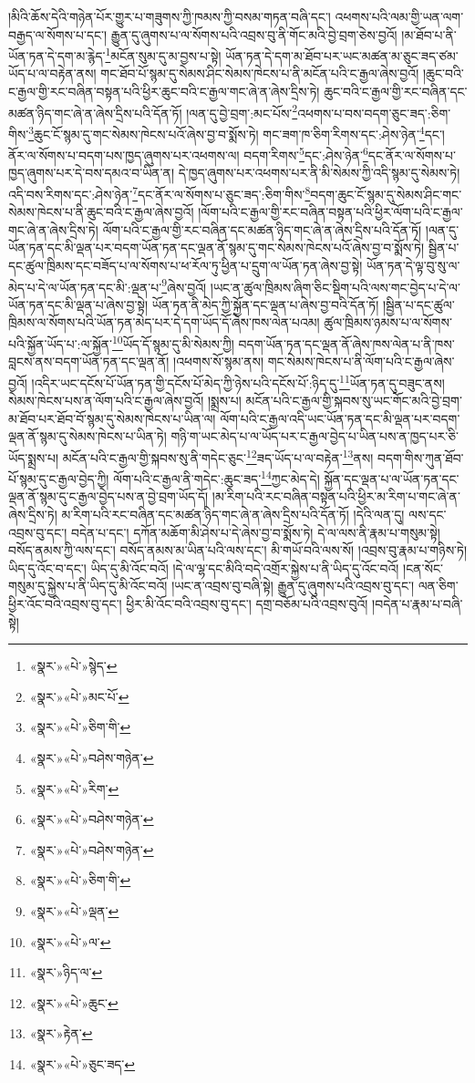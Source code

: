 །མིའི་ཆོས་དེའི་གཉེན་པོར་གྱུར་པ་གཟུགས་ཀྱི་ཁམས་ཀྱི་བསམ་གཏན་བཞི་དང་། འཕགས་པའི་ལམ་གྱི་ཡན་ལག་བརྒྱད་ལ་སོགས་པ་དང་། རྒྱུན་དུ་ཞུགས་པ་ལ་སོགས་པའི་འབྲས་བུ་ནི་གོང་མའི་བྱེ་བྲག་ཅེས་བྱའོ། །མ་ཐོབ་པ་ནི་ཡོན་ཏན་དེ་དག་མ་རྙེད་\footnote{«སྣར་»«པེ་»སྙེད་}མངོན་སུམ་དུ་མ་བྱས་པ་སྟེ། ཡོན་ཏན་དེ་དག་མ་ཐོབ་པར་ཡང་མཚན་མ་ཅུང་ཟད་ཙམ་ཡོད་པ་ལ་བརྟེན་ནས། གང་ཐོབ་པོ་སྙམ་དུ་སེམས་ཤིང་སེམས་ཁེངས་པ་ནི་མངོན་པའི་ང་རྒྱལ་ཞེས་བྱའོ། །ཆུང་བའི་ང་རྒྱལ་གྱི་རང་བཞིན་བསྟན་པའི་ཕྱིར་ཆུང་བའི་ང་རྒྱལ་གང་ཞེ་ན་ཞེས་དྲིས་ཏེ། ཆུང་བའི་ང་རྒྱལ་གྱི་རང་བཞིན་དང་མཚན་ཉིད་གང་ཞེ་ན་ཞེས་དྲིས་པའི་དོན་ཏོ། །ལན་དུ་བྱེ་བྲག་:མང་པོས་\footnote{«སྣར་»«པེ་»མང་པོ་}འཕགས་པ་བས་བདག་ཅུང་ཟད་:ཅིག་གིས་\footnote{«སྣར་»«པེ་»ཅིག་གི་}ཆུང་ངོ་སྙམ་དུ་གང་སེམས་ཁེངས་པའོ་ཞེས་བྱ་བ་སྨོས་ཏེ། གང་ཟག་ཁ་ཅིག་རིགས་དང་:ཤེས་ཉེན་\footnote{«སྣར་»«པེ་»བཤེས་གཉེན་}དང་། ནོར་ལ་སོགས་པ་བདག་པས་ཁྱད་ཞུགས་པར་འཕགས་ལ། བདག་རིགས་\footnote{«སྣར་»«པེ་»རིག་}དང་:ཤེས་ཉེན་\footnote{«སྣར་»«པེ་»བཤེས་གཉེན་}དང་ནོར་ལ་སོགས་པ་ཁྱད་ཞུགས་པར་དེ་བས་དམའ་བ་ཡིན་ན། དེ་ཁྱད་ཞུགས་པར་འཕགས་པར་ནི་མི་སེམས་ཀྱི་འདི་སྙམ་དུ་སེམས་ཏེ། འདི་བས་རིགས་དང་:ཤེས་ཉེན་\footnote{«སྣར་»«པེ་»བཤེས་གཉེན་}དང་ནོར་ལ་སོགས་པ་ཅུང་ཟད་:ཅིག་གིས་\footnote{«སྣར་»«པེ་»ཅིག་གི་}བདག་ཆུང་ངོ་སྙམ་དུ་སེམས་ཤིང་གང་སེམས་ཁེངས་པ་ནི་ཆུང་བའི་ང་རྒྱལ་ཞེས་བྱའོ། །ལོག་པའི་ང་རྒྱལ་གྱི་རང་བཞིན་བསྟན་པའི་ཕྱིར་ལོག་པའི་ང་རྒྱལ་གང་ཞེ་ན་ཞེས་དྲིས་ཏེ། ལོག་པའི་ང་རྒྱལ་གྱི་རང་བཞིན་དང་མཚན་ཉིད་གང་ཞེ་ན་ཞེས་དྲིས་པའི་དོན་ཏོ། །ལན་དུ་ཡོན་ཏན་དང་མི་ལྡན་པར་བདག་ཡོན་ཏན་དང་ལྡན་ནོ་སྙམ་དུ་གང་སེམས་ཁེངས་པའོ་ཞེས་བྱ་བ་སྨོས་ཏེ། སྦྱིན་པ་དང་ཚུལ་ཁྲིམས་དང་བཟོད་པ་ལ་སོགས་པ་ཕ་རོལ་ཏུ་ཕྱིན་པ་དྲུག་ལ་ཡོན་ཏན་ཞེས་བྱ་སྟེ། ཡོན་ཏན་དེ་ལྟ་བུ་སུ་ལ་མེད་པ་དེ་ལ་ཡོན་ཏན་དང་མི་:ལྡན་པ་\footnote{«སྣར་»«པེ་»ལྡན་}ཞེས་བྱའོ། །ཡང་ན་ཚུལ་ཁྲིམས་ཞིག་ཅིང་སྡིག་པའི་ལས་གང་བྱེད་པ་དེ་ལ་ཡོན་ཏན་དང་མི་ལྡན་པ་ཞེས་བྱ་སྟེ། ཡོན་ཏན་ནི་མེད་ཀྱི་སྐྱོན་དང་ལྡན་པ་ཞེས་བྱ་བའི་དོན་ཏོ། །སྦྱིན་པ་དང་ཚུལ་ཁྲིམས་ལ་སོགས་པའི་ཡོན་ཏན་མེད་པར་དེ་དག་ཡོད་དོ་ཞེས་ཁས་ལེན་པའམ། ཚུལ་ཁྲིམས་ཉམས་པ་ལ་སོགས་པའི་སྐྱོན་ཡོད་པ་:ལ་སྐྱོན་\footnote{«སྣར་»«པེ་»ལ་}ཡོད་དོ་སྙམ་དུ་མི་སེམས་ཀྱི། བདག་ཡོན་ཏན་དང་ལྡན་ནོ་ཞེས་ཁས་ལེན་པ་ནི་ཁས་བླངས་ནས་བདག་ཡོན་ཏན་དང་ལྡན་ནོ། །འཕགས་སོ་སྙམ་ནས། གང་སེམས་ཁེངས་པ་ནི་ལོག་པའི་ང་རྒྱལ་ཞེས་བྱའོ། །འདིར་ཡང་དངོས་པོ་ཡོན་ཏན་གྱི་དངོས་པོ་མེད་ཀྱི་ཉེས་པའི་དངོས་པོ་:ཉིད་དུ་\footnote{«སྣར་»ཉིད་ལ་}ཡོན་ཏན་དུ་བཟུང་ནས། སེམས་ཁེངས་པས་ན་ལོག་པའི་ང་རྒྱལ་ཞེས་བྱའོ། །སྨྲས་པ། མངོན་པའི་ང་རྒྱལ་གྱི་སྐབས་སུ་ཡང་གོང་མའི་བྱེ་བྲག་མ་ཐོབ་པར་ཐོབ་བོ་སྙམ་དུ་སེམས་ཁེངས་པ་ཡིན་ལ། ལོག་པའི་ང་རྒྱལ་འདི་ཡང་ཡོན་ཏན་དང་མི་ལྡན་པར་བདག་ལྡན་ནོ་སྙམ་དུ་སེམས་ཁེངས་པ་ཡིན་ཏེ། གཉི་ག་ཡང་མེད་པ་ལ་ཡོད་པར་ང་རྒྱལ་བྱེད་པ་ཡིན་པས་ན་ཁྱད་པར་ཅི་ཡོད་སྨྲས་པ། མངོན་པའི་ང་རྒྱལ་གྱི་སྐབས་སུ་ནི་གདེང་ཅུང་\footnote{«སྣར་»«པེ་»ཆུང་}ཟད་ཡོད་པ་ལ་བརྟེན་\footnote{«སྣར་»རྟེན་}ནས། བདག་གིས་ཀུན་ཐོབ་པོ་སྙམ་དུ་ང་རྒྱལ་བྱེད་ཀྱི། ལོག་པའི་ང་རྒྱལ་ནི་གདེང་:ཆུང་ཟད་\footnote{«སྣར་»«པེ་»ཅུང་ཟད་}ཀྱང་མེད་དེ། སྐྱོན་དང་ལྡན་པ་ལ་ཡོན་ཏན་དང་ལྡན་ནོ་སྙམ་དུ་ང་རྒྱལ་བྱེད་པས་ན་བྱེ་བྲག་ཡོད་དོ། །མ་རིག་པའི་རང་བཞིན་བསྟན་པའི་ཕྱིར་མ་རིག་པ་གང་ཞེ་ན་ཞེས་དྲིས་ཏེ། མ་རིག་པའི་རང་བཞིན་དང་མཚན་ཉིད་གང་ཞེ་ན་ཞེས་དྲིས་པའི་དོན་ཏོ། །དེའི་ལན་དུ། ལས་དང་འབྲས་བུ་དང་། བདེན་པ་དང་། དཀོན་མཆོག་མི་ཤེས་པ་དེ་ཞེས་བྱ་བ་སྨོས་ཏེ། དེ་ལ་ལས་ནི་རྣམ་པ་གསུམ་སྟེ། བསོད་ནམས་ཀྱི་ལས་དང་། བསོད་ནམས་མ་ཡིན་པའི་ལས་དང་། མི་གཡོ་བའི་ལས་སོ། །འབྲས་བུ་རྣམ་པ་གཉིས་ཏེ། ཡིད་དུ་འོང་བ་དང་། ཡིད་དུ་མི་འོང་བའོ། །དེ་ལ་ལྷ་དང་མིའི་བདེ་འགྲོར་སྐྱེས་པ་ནི་ཡིད་དུ་འོང་བའོ། །ངན་སོང་གསུམ་དུ་སྐྱེས་པ་ནི་ཡིད་དུ་མི་འོང་བའོ། །ཡང་ན་འབྲས་བུ་བཞི་སྟེ། རྒྱུན་དུ་ཞུགས་པའི་འབྲས་བུ་དང་། ལན་ཅིག་ཕྱིར་འོང་བའི་འབྲས་བུ་དང་། ཕྱིར་མི་འོང་བའི་འབྲས་བུ་དང་། དགྲ་བཅོམ་པའི་འབྲས་བུའོ། །བདེན་པ་རྣམ་པ་བཞི་སྟེ། 